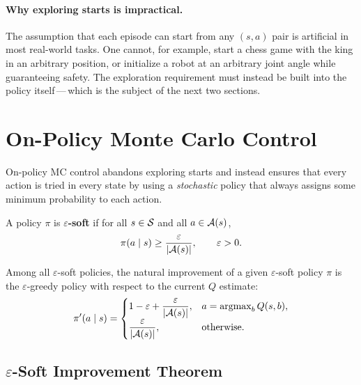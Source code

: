 \paragraph{Why exploring starts is impractical.}  The assumption that each episode can start from any $(s, a)$ pair is artificial in most real-world tasks.  One cannot, for example, start a chess game with the king in an arbitrary position, or initialize a robot at an arbitrary joint angle while guaranteeing safety.  The exploration requirement must instead be built into the policy itself\,---\,which is the subject of the next two sections.


\section{On-Policy Monte Carlo Control}
\label{sec:mc-on-policy}

On-policy MC control abandons exploring starts and instead ensures that every action is tried in every state by using a \emph{stochastic} policy that always assigns some minimum probability to each action.

\begin{definition}
\label{def:eps-soft}
A policy $\pi$ is \textbf{$\varepsilon$-soft} if for all $s \in \mathcal{S}$ and all $a \in \mathcal{A}(s)$,
\begin{equation}
  \label{eq:eps-soft}
  \pi(a \mid s) \ge \frac{\varepsilon}{|\mathcal{A}(s)|}, \qquad \varepsilon > 0.
\end{equation}
\end{definition}

Among all $\varepsilon$-soft policies, the natural improvement of a given $\varepsilon$-soft policy $\pi$ is the $\varepsilon$-greedy policy with respect to the current $Q$ estimate:
\begin{equation}
  \label{eq:eps-greedy-policy}
  \pi'(a \mid s) = \begin{cases}
    1 - \varepsilon + \dfrac{\varepsilon}{|\mathcal{A}(s)|}, & a = \operatorname*{argmax}_{b} Q(s, b), \\[6pt]
    \dfrac{\varepsilon}{|\mathcal{A}(s)|}, & \text{otherwise.}
  \end{cases}
\end{equation}

\subsection*{$\varepsilon$-Soft Improvement Theorem}

